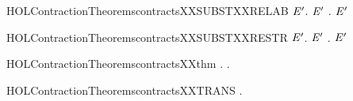 \newcommand{\HOLContractionTheoremscontractsXXSUBSTXXPREFIX}{\UseVerbatim{HOLContractionTheoremscontractsXXSUBSTXXPREFIX}}
\begin{SaveVerbatim}{HOLContractionTheoremscontractsXXSUBSTXXRELAB}
\HOLTokenTurnstile{} \HOLSymConst{\HOLTokenForall{}} \ensuremath{\HOLBoundVar{E}\sp{\prime{}}}.   \ensuremath{\HOLBoundVar{E}\sp{\prime{}}} \HOLSymConst{\HOLTokenImp{}} \HOLSymConst{\HOLTokenForall{}}.      \ensuremath{\HOLBoundVar{E}\sp{\prime{}}} 
\end{SaveVerbatim}
\newcommand{\HOLContractionTheoremscontractsXXSUBSTXXRELAB}{\UseVerbatim{HOLContractionTheoremscontractsXXSUBSTXXRELAB}}
\begin{SaveVerbatim}{HOLContractionTheoremscontractsXXSUBSTXXRESTR}
\HOLTokenTurnstile{} \HOLSymConst{\HOLTokenForall{}} \ensuremath{\HOLBoundVar{E}\sp{\prime{}}}.   \ensuremath{\HOLBoundVar{E}\sp{\prime{}}} \HOLSymConst{\HOLTokenImp{}} \HOLSymConst{\HOLTokenForall{}}.       \ensuremath{\HOLBoundVar{E}\sp{\prime{}}}
\end{SaveVerbatim}
\newcommand{\HOLContractionTheoremscontractsXXSUBSTXXRESTR}{\UseVerbatim{HOLContractionTheoremscontractsXXSUBSTXXRESTR}}
\begin{SaveVerbatim}{HOLContractionTheoremscontractsXXthm}
\HOLTokenTurnstile{} \HOLSymConst{\HOLTokenForall{}} .    \HOLSymConst{\HOLTokenEquiv{}} \HOLSymConst{\HOLTokenExists{}}.    \HOLSymConst{\HOLTokenConj{}}  
\end{SaveVerbatim}
\newcommand{\HOLContractionTheoremscontractsXXthm}{\UseVerbatim{HOLContractionTheoremscontractsXXthm}}
\begin{SaveVerbatim}{HOLContractionTheoremscontractsXXTRANS}
\HOLTokenTurnstile{} \HOLSymConst{\HOLTokenForall{}}  .    \HOLSymConst{\HOLTokenConj{}}    \HOLSymConst{\HOLTokenImp{}}   
\end{SaveVerbatim}

